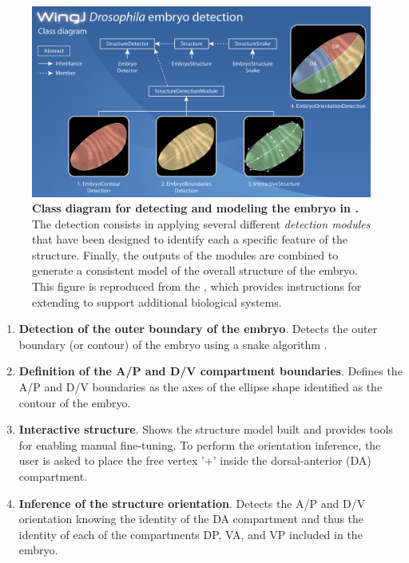 \begin{figure}[!h]
\centering
\includegraphics[scale=0.32]{images/wingj-embryo-diagram-720p.jpg}
\caption{\textbf{Class diagram for detecting and modeling the \droso embryo in \wingj.} The detection consists in applying several different \textit{detection modules} that have been designed to identify each a specific feature of the structure. Finally, the outputs of the modules are combined to generate a consistent model of the overall structure of the embryo. This figure is reproduced from the \wingjDeveloperGuide, which provides instructions for extending \wingj to support additional biological systems.}
\label{fig:wingj_embryo_detection_modules}
\end{figure}

\begin{enumerate}
 \item \textbf{Detection of the outer boundary of the embryo}. Detects the outer boundary (or contour) of the embryo using a snake algorithm \autocite{DelgadoGonzalo2012a}.
 \item \textbf{Definition of the A/P and D/V compartment boundaries}. Defines the A/P and D/V boundaries as the axes of the ellipse shape identified as the contour of the embryo.
 \item \textbf{Interactive structure}.  Shows the structure model built and provides tools for enabling manual fine-tuning. To perform the orientation inference, the user is asked to place the free vertex '+' inside the dorsal-anterior (DA) compartment.
 \item \textbf{Inference of the structure orientation}. Detects the A/P and D/V orientation knowing the identity of the DA compartment and thus the identity of each of the compartments DP, VA, and VP included in the embryo.
\end{enumerate}


